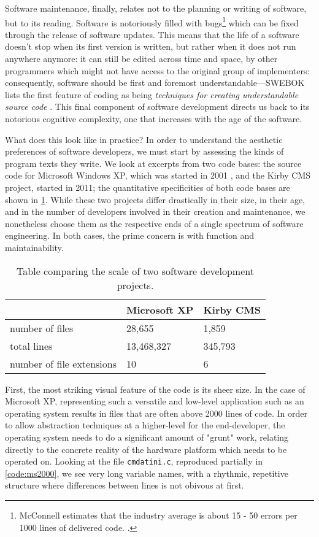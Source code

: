 Software maintenance, finally, relates not to the planning or writing of software, but to its reading. Software is notoriously filled with bugs\footnote{McConnell estimates that the industry average is about 15 - 50 errors per 1000 lines of delivered code. \citep{mcconnell_code_2004}.} which can be fixed through the release of software updates. This means that the life of a software doesn't stop when its first version is written, but rather when it does not run anywhere anymore: it can still be edited across time and space, by other programmers which might not have access to the original group of implementers: consequently, software should be first and foremost understandable—SWEBOK lists the first feature of coding as being \emph{techniques for creating understandable source code} \citep{bourque_swebok_2014}. This final component of software development directs us back to its notorious cognitive complexity, one that increases with the age of the software.

What does this look like in practice? In order to understand the aesthetic preferences of software developers, we must start by assessing the kinds of program texts they write. We look at excerpts from two code bases: the source code for Microsoft Windows XP, which was started in 2001 \citep{warren_windows_2020}, and the Kirby CMS project, started in 2011; the quantitative specificities of both code bases are shown in \ref{table:ms-kirby}. While these two projects differ drastically in their size, in their age, and in the number of developers involved in their creation and maintenance, we nonetheless choose them as the respective ends of a single spectrum of software engineering. In both cases, the prime concern is with function and maintainability.

\begin{table}
  \begin{tabular}{lll}
                              & Microsoft XP & Kirby CMS \\
    \hline
    number of files           & 28,655       & 1,859     \\
    \hline
    total lines               & 13,468,327   & 345,793   \\
    \hline
    number of file extensions & 10           & 6
  \end{tabular}
  \caption{Table comparing the scale of two software development projects.}
  \label{table:ms-kirby}
\end{table}

First, the most striking visual feature of the code is its sheer size. In the case of Microsoft XP, representing such a versatile and low-level application such as an operating system results in files that are often above 2000 lines of code. In order to allow abstraction techniques at a higher-level for the end-developer, the operating system needs to do a significant amount of "grunt" work, relating directly to the concrete reality of the hardware platform which needs to be operated on. Looking at the file \lstinline{cmdatini.c}, reproduced partially in \ref{code:ms2000}, we see very long variable names, with a rhythmic, repetitive structure where differences between lines is not obivous at first.

